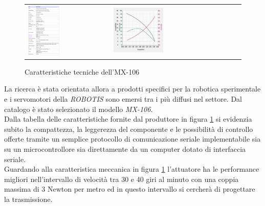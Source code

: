 \documentclass[%
corpo=11pt,
twoside,
 stile=classica,
oldstyle,
greek,%
]{toptesi}
\begin{document}
	\begin{figure}
		\centering
		\begin{tabular}{ll}
			\includegraphics[width=0.4\textwidth]{image/mx160data.png}
			&
			\includegraphics[width=0.4\textwidth]{image/mx160figure.png}
		\end{tabular}
		\caption{Caratteristiche tecniche dell'MX-106 }
		\label{fig:MX160data}
	\end{figure}



	La ricerca è stata orientata allora a prodotti specifici per la robotica sperimentale e i servomotori della \textit{ROBOTIS} sono emersi tra i più diffusi nel settore. Dal catalogo è stato selezionato il modello \textit{MX-106}. \\
	Dalla tabella delle caratteristiche fornite dal produttore in figura \ref{fig:MX160data} si evidenzia subito la compattezza, la leggerezza del componente e le possibilità di controllo offerte tramite un semplice protocollo di comunicazione seriale implementabile sia su un microcontrollore sia direttamente da un computer dotato di interfaccia seriale.\\
	Guardando alla caratteristica meccanica in figura \ref{fig:MX160data} l'attuatore ha le performance migliori nell'intervallo di velocità tra 30 e 40 giri al minuto con una coppia massima di 3 Newton per metro ed in questo intervallo si cercherà di progettare la trasmissione. \\
	
\end{document}
